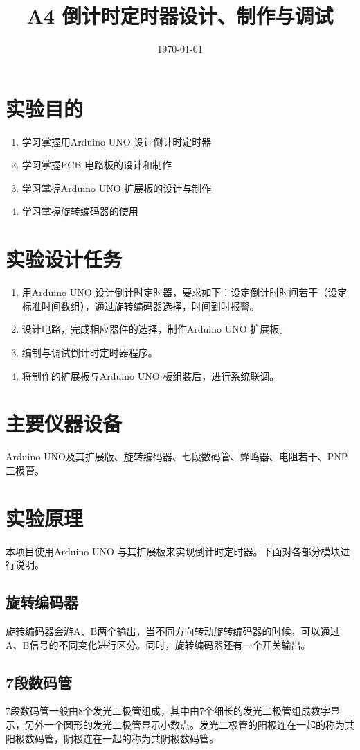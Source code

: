 \documentclass{../source/Experiment}
\title{A4 倒计时定时器设计、制作与调试}
\date{\today}
\begin{document}
    \makecover
    \makeheader
    \section{实验目的}
        \begin{enumerate}
            \item 学习掌握用Arduino UNO 设计倒计时定时器
            \item 学习掌握PCB 电路板的设计和制作
            \item 学习掌握Arduino UNO 扩展板的设计与制作
            \item 学习掌握旋转编码器的使用
        \end{enumerate}
    \section{实验设计任务}
        \begin{enumerate}
            \item 用Arduino UNO 设计倒计时定时器，要求如下：设定倒计时时间若干（设定标准时间数组），通过旋转编码器选择，时间到时报警。
            \item 设计电路，完成相应器件的选择，制作Arduino UNO 扩展板。
            \item 编制与调试倒计时定时器程序。
            \item 将制作的扩展板与Arduino UNO 板组装后，进行系统联调。
        \end{enumerate}
    \section{主要仪器设备}
    Arduino UNO及其扩展版、旋转编码器、七段数码管、蜂鸣器、电阻若干、PNP三极管。
    \section{实验原理}
    本项目使用Arduino UNO 与其扩展板来实现倒计时定时器。下面对各部分模块进行说明。
        \subsection{旋转编码器}
        旋转编码器会游A、B两个输出，当不同方向转动旋转编码器的时候，可以通过A、B信号的不同变化进行区分。同时，旋转编码器还有一个开关输出。
        \subsection{7段数码管}
        7段数码管一般由8个发光二极管组成，其中由7个细长的发光二极管组成数字显示，另外一个圆形的发光二极管显示小数点。发光二极管的阳极连在一起的称为共阳极数码管，阴极连在一起的称为共阴极数码管。
\end{document}
